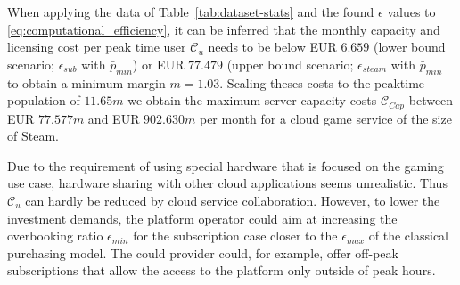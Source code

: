 %

When applying the data of Table~\ref{tab:dataset-stats} and the found $\epsilon$ values to \eqref{eq:computational_efficiency}, it can be inferred that the monthly capacity and licensing cost per peak time user $\mathcal{C}_u$ needs to be below EUR $6.659$ (lower bound scenario; $\epsilon_{sub}$ with $\bar{p}_{min}$) or EUR $77.479$ (upper bound scenario; $\epsilon_{steam}$ with $\bar{p}_{min}$ to obtain a minimum margin $m=1.03$. Scaling theses costs to the peaktime population of $11.65m$ we obtain the maximum server capacity costs $\mathcal{C}_{Cap}$ between EUR $77.577m$ and EUR $902.630m$ per month for a cloud game service of the size of Steam.





Due to the requirement of using special hardware that is focused on the gaming use case, hardware sharing with other cloud applications seems unrealistic. Thus $\mathcal{C}_u$ can hardly be reduced by cloud service collaboration. However, to lower the investment demands, the platform operator could aim at increasing the overbooking ratio $\epsilon_{min}$ for the subscription case closer to the $\epsilon_{max}$ of the classical purchasing model. The could provider could, for example, offer off-peak subscriptions that allow the access to the platform only outside of peak hours.


